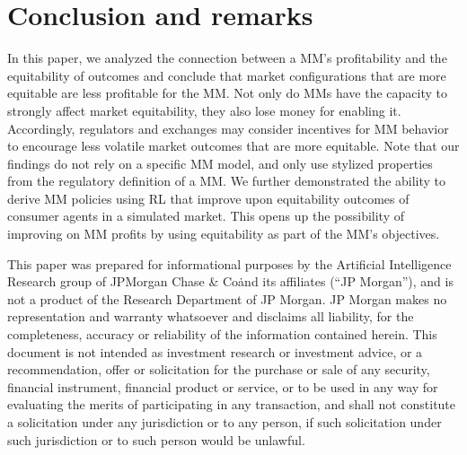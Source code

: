 \documentclass[sigconf]{acmart}
\begin{document}
\section{Conclusion and remarks}

{
In this paper, we analyzed the connection between a MM’s profitability and the equitability of outcomes and conclude
that market configurations that are more equitable are less
profitable for the MM. Not only do MMs have the capacity to strongly affect market equitability, they also lose money
for enabling it. Accordingly, regulators and exchanges may
consider incentives for MM behavior to
encourage less volatile market outcomes that are more equitable.
Note that our findings do not rely on a specific MM
model, and only use stylized properties from the regulatory
definition of a MM. We further demonstrated the ability to derive MM policies using RL that improve upon equitability outcomes of consumer agents in a simulated market. This opens up the possibility of improving on MM profits by using equitability as part of the MM's objectives.}

\begin{acks}
This paper was prepared for informational purposes by the Artificial Intelligence Research group of JPMorgan Chase \& Co\. and its affiliates (``JP Morgan''), and is not a product of the Research Department of JP Morgan. JP Morgan makes no representation and warranty whatsoever and disclaims all liability, for the completeness, accuracy or reliability of the information contained herein. This document is not intended as investment research or investment advice, or a recommendation, offer or solicitation for the purchase or sale of any security, financial instrument, financial product or service, or to be used in any way for evaluating the merits of participating in any transaction, and shall not constitute a solicitation under any jurisdiction or to any person, if such solicitation under such jurisdiction or to such person would be unlawful.
\end{acks}



\end{document}
